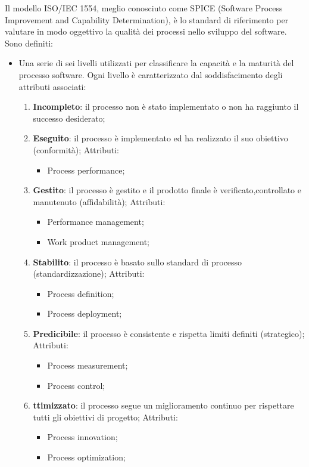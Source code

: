 Il modello ISO/IEC 1554, meglio conosciuto come SPICE (Software Process Improvement and Capability Determination), è lo standard di riferimento per valutare in modo oggettivo la qualità dei processi nello sviluppo del software. \newline
Sono definiti:
\begin{itemize}
	\item Una serie di sei livelli utilizzati per classificare la capacità e la maturità del processo software. Ogni livello è caratterizzato dal soddisfacimento degli attributi associati:
	\begin{enumerate} 
	\item \textbf{Incompleto}: il processo non è stato implementato o non ha raggiunto il successo desiderato;
	\item \textbf{Eseguito}: il processo è implementato ed ha realizzato il suo obiettivo (conformità);
		Attributi:
		\begin{itemize}
	    	\item Process performance;
    		\end{itemize}
	\item \textbf{Gestito}: il processo è gestito e il prodotto finale è verificato,controllato e manutenuto (affidabilità);
		Attributi:
		\begin{itemize}	
	    	\item Performance management;
	    	\item Work product management;
		\end{itemize}
    	\item \textbf{Stabilito}: il processo è basato sullo standard di processo (standardizzazione);
		Attributi:
		\begin{itemize}
		\item Process definition;
		\item Process deployment;
		\end{itemize}
    	\item \textbf{Predicibile}: il processo è consistente e rispetta limiti definiti (strategico);
		Attributi:
		\begin{itemize}
		\item Process measurement;
		\item Process control;
		\end{itemize}
    	\item \textbf{ttimizzato}: il processo segue un  miglioramento continuo per rispettare tutti gli obiettivi di progetto;
		Attributi:
		\begin{itemize}
		\item Process innovation;
		\item Process optimization;
		\end{itemize}
    	\end{enumerate}
	

\end{itemize}

